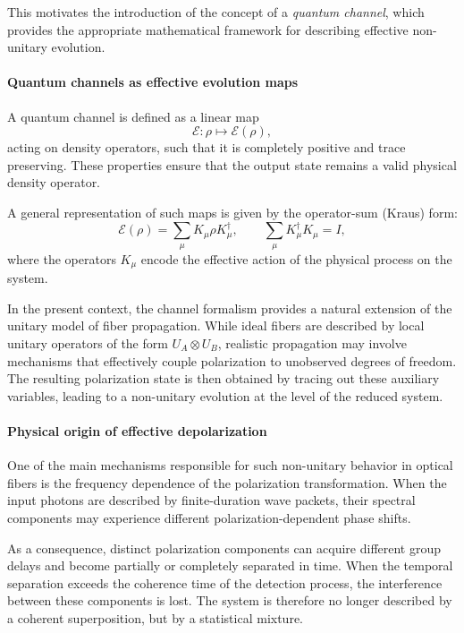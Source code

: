 \documentclass[a4paper]{article}
\begin{document}
\medskip

This motivates the introduction of the concept of a \emph{quantum channel}, which provides the appropriate mathematical framework for describing effective non-unitary evolution.

\paragraph{Quantum channels as effective evolution maps}

A quantum channel is defined as a linear map
\[
\mathcal{E} : \rho \mapsto \mathcal{E}(\rho),
\]
acting on density operators, such that it is completely positive and trace preserving. These properties ensure that the output state remains a valid physical density operator.

A general representation of such maps is given by the operator-sum (Kraus) form:
\[
\mathcal{E}(\rho)
=
\sum_{\mu} K_{\mu} \rho K_{\mu}^\dagger,
\qquad
\sum_{\mu} K_{\mu}^\dagger K_{\mu} = I,
\]
where the operators \(K_{\mu}\) encode the effective action of the physical process on the system.

\medskip

In the present context, the channel formalism provides a natural extension of the unitary model of fiber propagation. While ideal fibers are described by local unitary operators of the form \(U_A \otimes U_B\), realistic propagation may involve mechanisms that effectively couple polarization to unobserved degrees of freedom. The resulting polarization state is then obtained by tracing out these auxiliary variables, leading to a non-unitary evolution at the level of the reduced system.

\paragraph{Physical origin of effective depolarization}

One of the main mechanisms responsible for such non-unitary behavior in optical fibers is the frequency dependence of the polarization transformation. When the input photons are described by finite-duration wave packets, their spectral components may experience different polarization-dependent phase shifts.

As a consequence, distinct polarization components can acquire different group delays and become partially or completely separated in time. When the temporal separation exceeds the coherence time of the detection process, the interference between these components is lost. The system is therefore no longer described by a coherent superposition, but by a statistical mixture.
\end{document}
